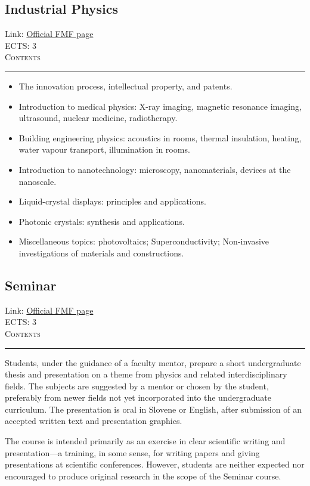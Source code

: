 \documentclass[11pt, a4paper]{article}
\newenvironment{course}[3]{
\subsection{#1}%
Link: \href{#2}{Official FMF page}\\%
ECTS: #3%
\vspace{1ex}
\\
{\large \textsc{Contents}}\\[-0.9ex]%
\rule{\textwidth}{0.5pt}
\vspace{-3ex}
}
{}
\newenvironment{chapter}[1]{
\begin{tcolorbox}[title=#1, breakable]
}
{\end{tcolorbox}}
\begin{document}
\begin{course}{Industrial Physics}{https://www.fmf.uni-lj.si/en/study-physics/programmes/1fiz/2020/7000777/courses/1149/}{3}
    \label{industrial-physics}

    \begin{chapter}{Material}
        \begin{itemize}
        
            \item The innovation process, intellectual property, and patents.

            \item Introduction to medical physics: X-ray imaging, magnetic resonance imaging, ultrasound, nuclear medicine, radiotherapy.

            \item Building engineering physics: acoustics in rooms, thermal insulation, heating, water vapour transport, illumination in rooms.

            \item Introduction to nanotechnology: microscopy, nanomaterials, devices at the nanoscale. 

            \item Liquid-crystal displays: principles and applications.

            \item Photonic crystals: synthesis and applications.

            \item Miscellaneous topics: photovoltaics; Superconductivity; Non-invasive investigations of materials and constructions.
        
        \end{itemize}
    \end{chapter}
\end{course}

\begin{course}{Seminar}{https://www.fmf.uni-lj.si/en/study-physics/programmes/1fiz/2020/7000777/courses/1173/}{3}
    \label{seminar}

    \begin{chapter}{Course description}
        Students, under the guidance of a faculty mentor, prepare a short undergraduate thesis and presentation on a theme from physics and related interdisciplinary fields.
        The subjects are suggested by a mentor or chosen by the student, preferably from newer fields not yet incorporated into the undergraduate curriculum.
        The presentation is oral in Slovene or English, after submission of an accepted written text and presentation graphics.

        The course is intended primarily as an exercise in clear scientific writing and presentation---a training, in some sense, for writing papers and giving presentations at scientific conferences.
        However, students are neither expected nor encouraged to produce original research in the scope of the Seminar course.

    \end{chapter}
\end{course}
\end{document}
